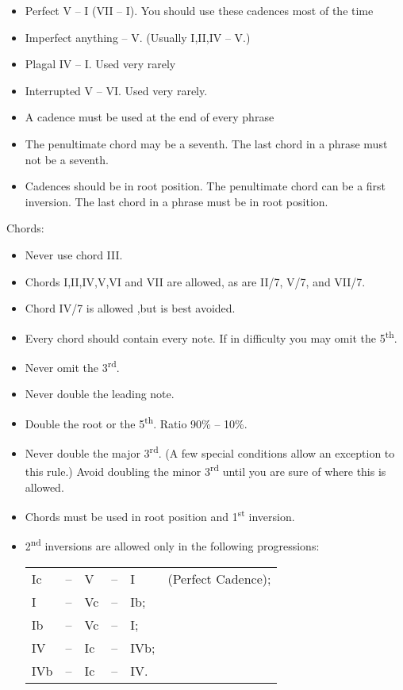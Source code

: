 \documentclass{article}
\begin{document}
\begin{itemize}
    \item Perfect V -- I (VII -- I).
        You should use these cadences most of the time
    \item Imperfect anything -- V.
        (Usually I,II,IV -- V.)
    \item Plagal IV -- I.
        Used very rarely
    \item Interrupted V -- VI.
        Used very rarely.
    \item A cadence must be used at the end of every phrase
    \item The penultimate chord may be a seventh.
        The last chord in a phrase must not be a seventh.
    \item Cadences should be in root position.
        The penultimate chord can be a first inversion.
        The last chord in a phrase must be in root position.
\end{itemize}
Chords:
\begin{itemize}
    \item Never use chord III.
    \item Chords I,II,IV,V,VI and VII are allowed, as are II/7, V/7, and VII/7.
    \item Chord IV/7 is allowed ,but is best avoided.
    \item Every chord should contain every note.
        If in difficulty you may omit the 5\textsuperscript{th}.
    \item Never omit the 3\textsuperscript{rd}.
    \item Never double the leading note.
    \item Double the root or the 5\textsuperscript{th}.
        Ratio 90\% -- 10\%.
    \item Never double the major 3\textsuperscript{rd}.
        (A few special conditions allow an exception to this rule.)
        Avoid doubling the minor 3\textsuperscript{rd} until you are sure of where this is allowed.
    \item Chords must be used in root position and 1\textsuperscript{st} inversion.
    \item 2\textsuperscript{nd} inversions are allowed only in the following progressions:

        \begin{tabular}{lclcll}
            Ic  & -- & V  & -- & I   & (Perfect Cadence);\\
            I   & -- & Vc & -- & Ib; &\\
            Ib  & -- & Vc & -- & I;  &\\
            IV  & -- & Ic & -- & IVb;&\\
            IVb & -- & Ic & -- & IV. &\\
        \end{tabular}
\end{itemize}
\end{document}
